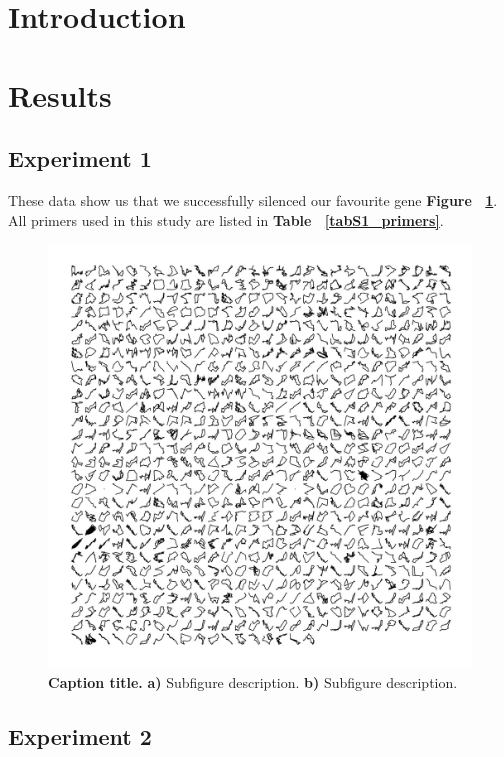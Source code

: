 \documentclass[onecolumn, 11pt,openany]{memoir}
\begin{document}
\begin{multicols}{2}
\section{Introduction}
\lipsum[2-5]

\section{Results}
\subsection{Experiment 1}
\lipsum[6-8]

These data show us that we successfully silenced our favourite gene \textbf{Figure ~\ref{fig1}}. All primers used in this study are listed in \textbf{Table ~\ref{tabS1_primers}}.

\begin{figure}[t]
\centering
\includegraphics[width=1\textwidth]{Figures/Fig1}
\caption{\textbf{Caption title.} \textbf{a)} Subfigure description. \textbf{b)} Subfigure description.}
\label{fig1}
\end{figure}

\subsection{Experiment 2}
\lipsum[9]


\end{multicols}
\end{document}
